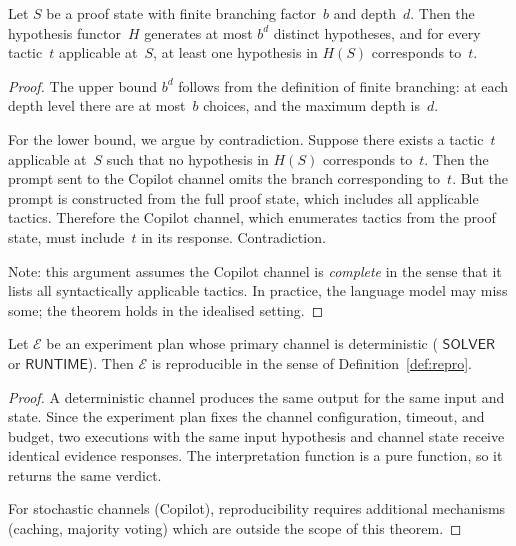 \documentclass[11pt]{article}
\begin{document}
\begin{theorem}\label{thm:coverage}
Let $S$ be a proof state with finite branching factor~$b$
and depth~$d$.  Then the hypothesis functor~$H$ generates
at most $b^d$ distinct hypotheses, and for every tactic~$t$
applicable at~$S$, at least one hypothesis in $H(S)$
corresponds to~$t$.
\end{theorem}
\begin{proof}
The upper bound $b^d$ follows from the definition of finite
branching: at each depth level there are at most~$b$ choices,
and the maximum depth is~$d$.

For the lower bound, we argue by contradiction.  Suppose
there exists a tactic~$t$ applicable at~$S$ such that no
hypothesis in $H(S)$ corresponds to~$t$.  Then the prompt
sent to the Copilot channel omits the branch corresponding
to~$t$.  But the prompt is constructed from the full proof
state, which includes all applicable tactics.  Therefore the
Copilot channel, which enumerates tactics from the proof
state, must include~$t$ in its response.  Contradiction.

Note: this argument assumes the Copilot channel is
\emph{complete} in the sense that it lists all syntactically
applicable tactics.  In practice, the language model may
miss some; the theorem holds in the idealised setting.
\end{proof}

\begin{theorem}\label{thm:repro}
Let $\mathcal{E}$ be an experiment plan whose primary channel
is deterministic (\eg{} $\mathsf{SOLVER}$ or $\mathsf{RUNTIME}$).
Then $\mathcal{E}$ is reproducible in the sense of
Definition~\ref{def:repro}.
\end{theorem}
\begin{proof}
A deterministic channel produces the same output for the
same input and state.  Since the experiment plan fixes
the channel configuration, timeout, and budget, two
executions with the same input hypothesis and channel state
receive identical evidence responses.  The interpretation
function is a pure function, so it returns the same verdict.

For stochastic channels (Copilot), reproducibility requires
additional mechanisms (caching, majority voting) which are
outside the scope of this theorem.
\end{proof}

\end{document}
